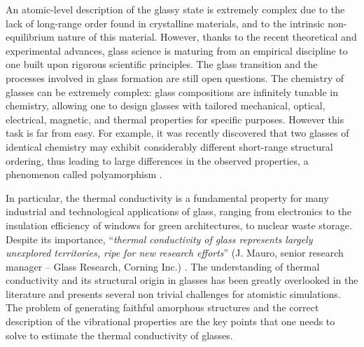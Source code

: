 An atomic-level description of the glassy state is extremely complex due to the lack of long-range order found in crystalline materials, and to the intrinsic non-equilibrium nature of this material. However, thanks to the recent theoretical and experimental advances, glass science is maturing from an empirical discipline to one built upon rigorous scientific principles. 
The glass transition and the processes involved in glass formation are still open questions. 
The chemistry of glasses can be extremely complex: glass compositions are infinitely tunable in chemistry, allowing one to design glasses with tailored mechanical, optical, electrical, magnetic, and thermal properties for specific purposes. 
However this task is far from easy. For example, it was recently discovered that two glasses of identical chemistry may exhibit considerably different short-range structural ordering, thus leading to large differences in the observed properties, a phenomenon called polyamorphism \cite{Huang2004,McMillan2004}. 

In particular, the thermal conductivity is a fundamental property for many industrial and technological applications of glass, ranging from electronics to the insulation efficiency of windows for green architectures, to nuclear waste storage. Despite its importance, ``\emph{thermal conductivity of glass represents largely unexplored territories, ripe for new research efforts}'' (J. Mauro, senior research manager -- Glass Research, Corning Inc.) \cite{MauroFM14}. 
The understanding of thermal conductivity and its structural origin in glasses has been greatly overlooked in the literature and presents several non trivial challenges for atomistic simulations. 
The problem of generating faithful amorphous structures and the correct description of the vibrational properties are the key points that one needs to solve to estimate the thermal conductivity of glasses.


